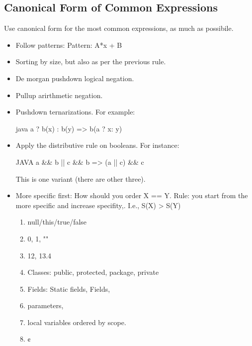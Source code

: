 \subsection{Canonical Form of Common Expressions}
Use canonical form for the most common expressions, as much as possibile.
\begin{itemize}
  \item Follow patterns: Pattern: A*x + B
  \item Sorting by size, but also as per the previous rule.
  \item De morgan pushdown logical negation.
  \item Pullup arirthmetic negation.
  \item Pushdown ternarizations. For example:
  \begin{code}{java}
a ? b(x) : b(y) => b(a ? x: y)
  \end{code}
  \item Apply the distributive rule on booleans. For instance:
    \begin{code}{JAVA}
a && b || c && b => (a || c) && c
    \end{code}
      This is one variant (there are other three).
  \item More specific first: How should you order X == Y.
        Rule: you start from the more specific and increase specifity,.
        I.e., S(X) > S(Y)
        \begin{enumerate}
          \item null/this/true/false
          \item 0, 1, ""
          \item 12, 13.4
          \item Classes: public, protected, package, private
          \item Fields: Static fields, Fields,
          \item parameters,
          \item local variables ordered by scope.
          \item ¢
        \end{enumerate}
\end{itemize}

